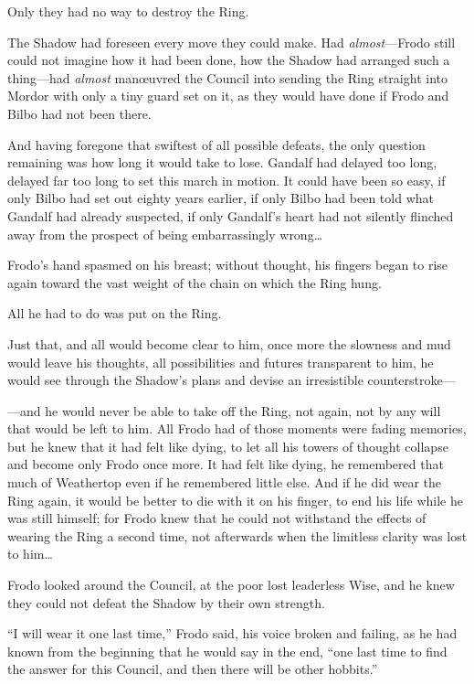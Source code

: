 Only they had no way to destroy the Ring.

The Shadow had foreseen every move they could make. Had \emph{almost}—Frodo still could not imagine how it had been done, how the Shadow had arranged such a thing—had \emph{almost} manœuvred the Council into sending the Ring straight into Mordor with only a tiny guard set on it, as they would have done if Frodo and Bilbo had not been there.

And having foregone that swiftest of all possible defeats, the only question remaining was how long it would take to lose. Gandalf had delayed too long, delayed far too long to set this march in motion. It could have been so easy, if only Bilbo had set out eighty years earlier, if only Bilbo had been told what Gandalf had already suspected, if only Gandalf’s heart had not silently flinched away from the prospect of being embarrassingly wrong…

Frodo’s hand spasmed on his breast; without thought, his fingers began to rise again toward the vast weight of the chain on which the Ring hung.

All he had to do was put on the Ring.

Just that, and all would become clear to him, once more the slowness and mud would leave his thoughts, all possibilities and futures transparent to him, he would see through the Shadow’s plans and devise an irresistible counterstroke—

—and he would never be able to take off the Ring, not again, not by any will that would be left to him. All Frodo had of those moments were fading memories, but he knew that it had felt like dying, to let all his towers of thought collapse and become only Frodo once more. It had felt like dying, he remembered that much of Weathertop even if he remembered little else. And if he did wear the Ring again, it would be better to die with it on his finger, to end his life while he was still himself; for Frodo knew that he could not withstand the effects of wearing the Ring a second time, not afterwards when the limitless clarity was lost to him…

Frodo looked around the Council, at the poor lost leaderless Wise, and he knew they could not defeat the Shadow by their own strength.

“I will wear it one last time,” Frodo said, his voice broken and failing, as he had known from the beginning that he would say in the end, “one last time to find the answer for this Council, and then there will be other hobbits.”

